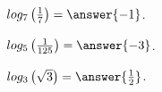 \documentclass{ximera}
\author{Lee Wayand}
\begin{document}
\begin{exercise}







\begin{question}


$log_7\left( \frac{1}{7} \right) = \answer{-1}$.


\end{question}








\begin{question}


$log_5\left( \frac{1}{125} \right) = \answer{-3}$.


\end{question}











\begin{question}


$log_3\left( \sqrt{3} \right) = \answer{\frac{1}{2}}$.


\end{question}









\end{exercise}
\end{document}
